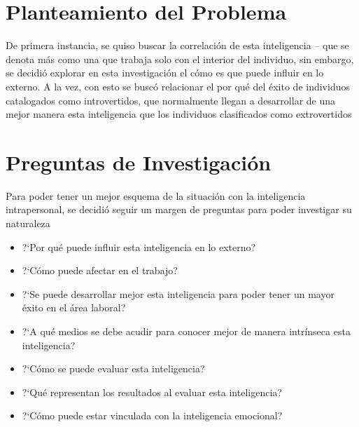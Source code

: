 \section{Planteamiento del Problema}
De primera instancia, se quiso buscar la correlaci\'on de esta inteligencia --
que se denota m\'as como una que trabaja solo con el interior del individuo, sin
embargo, se decidi\'o explorar en esta investigaci\'on el c\'omo es que puede
influir en lo externo. A la vez, con esto se busc\'o relacionar el por qu\'e del
\'exito de individuos catalogados como introvertidos, que normalmente llegan a
desarrollar de una mejor manera esta inteligencia que los individuos
clasificados como extrovertidos
\section{Preguntas de Investigaci\'on}
Para poder tener un mejor esquema de la situaci\'on con la inteligencia
intrapersonal, se decidi\'o seguir un margen de preguntas para poder investigar
su naturaleza
\begin{itemize}
\item ?`Por qu\'e puede influir esta inteligencia en lo externo?
\item ?`C\'omo puede afectar en el trabajo?
\item ?`Se puede desarrollar mejor esta inteligencia para poder tener un mayor
\'exito en el \'area laboral?
\item ?`A qu\'e medios se debe acudir para conocer mejor de manera intr\'inseca
	esta inteligencia?
\item ?`C\'omo se puede evaluar esta inteligencia?
\item ?`Qu\'e representan los resultados al evaluar esta inteligencia?
\item ?`C\'omo puede estar vinculada con la inteligencia emocional?
\end{itemize}
